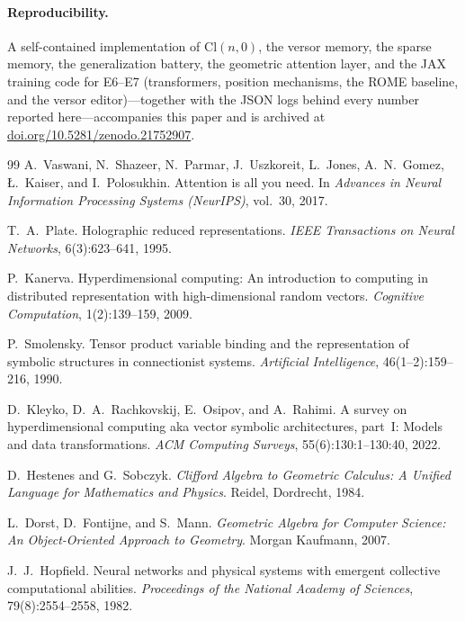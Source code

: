 \documentclass[10pt,twocolumn]{article}
\newcommand{\Cl}{\mathrm{Cl}}
\begin{document}
\paragraph{Reproducibility.} A self-contained implementation of $\Cl(n,0)$, the
versor memory, the sparse memory, the generalization battery, the geometric
attention layer, and the JAX training code for E6--E7 (transformers, position
mechanisms, the ROME baseline, and the versor editor)---together with the JSON
logs behind every number reported here---accompanies this paper and is archived at
\href{https://doi.org/10.5281/zenodo.21752907}{doi.org/10.5281/zenodo.21752907}.

\begin{thebibliography}{99}
\small
{} A.~Vaswani, N.~Shazeer, N.~Parmar, J.~Uszkoreit, L.~Jones,
A.~N.~Gomez, {\L}.~Kaiser, and I.~Polosukhin. Attention is all you need. In
\emph{Advances in Neural Information Processing Systems (NeurIPS)}, vol.~30, 2017.

 T.~A.~Plate. Holographic reduced representations.
\emph{IEEE Transactions on Neural Networks}, 6(3):623--641, 1995.

 P.~Kanerva. Hyperdimensional computing: An introduction to
computing in distributed representation with high-dimensional random vectors.
\emph{Cognitive Computation}, 1(2):139--159, 2009.

 P.~Smolensky. Tensor product variable binding and the
representation of symbolic structures in connectionist systems.
\emph{Artificial Intelligence}, 46(1--2):159--216, 1990.

 D.~Kleyko, D.~A.~Rachkovskij, E.~Osipov, and A.~Rahimi.
A survey on hyperdimensional computing aka vector symbolic architectures, part~I:
Models and data transformations. \emph{ACM Computing Surveys}, 55(6):130:1--130:40, 2022.

 D.~Hestenes and G.~Sobczyk. \emph{Clifford Algebra to
Geometric Calculus: A Unified Language for Mathematics and Physics}. Reidel,
Dordrecht, 1984.

 L.~Dorst, D.~Fontijne, and S.~Mann. \emph{Geometric Algebra
for Computer Science: An Object-Oriented Approach to Geometry}. Morgan Kaufmann,
2007.

 J.~J.~Hopfield. Neural networks and physical systems with
emergent collective computational abilities. \emph{Proceedings of the National
Academy of Sciences}, 79(8):2554--2558, 1982.


\end{thebibliography}
\end{document}
